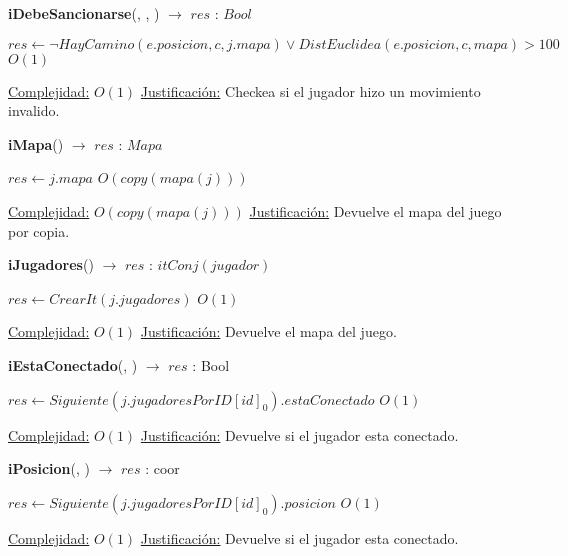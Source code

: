 \begin{algorithm}[H]{\textbf{iDebeSancionarse}(, , ) $\to$ $res$ : $Bool$} 
	\begin{algorithmic}
		\State $res \gets \neg HayCamino(e.posicion, c, j.mapa) \lor DistEuclidea(e.posicion, c, mapa) > 100 $ \Comment $O(1)$
	
		\medskip
		\Statex \underline{Complejidad:} $O(1)$
		\Statex \underline{Justificación:} Checkea si el jugador hizo un movimiento invalido.
    \end{algorithmic}
\end{algorithm}

\begin{algorithm}[H]{\textbf{iMapa}() $\to$ $res$ : $Mapa$} 
	{}
	\begin{algorithmic}
		\State $res \gets j.mapa $ \Comment $O(copy(mapa(j)))$
	
		\medskip
		\Statex \underline{Complejidad:} $O(copy(mapa(j)))$
		\Statex \underline{Justificación:} Devuelve el mapa del juego por copia.
    \end{algorithmic}
\end{algorithm}

\begin{algorithm}[H]{\textbf{iJugadores}() $\to$ $res$ : $itConj(jugador)$} 
	{}
	\begin{algorithmic}
		\State $res \gets CrearIt(j.jugadores) $ \Comment $O(1)$
	
		\medskip
		\Statex \underline{Complejidad:} $O(1)$
		\Statex \underline{Justificación:} Devuelve el mapa del juego.
    \end{algorithmic}
\end{algorithm}

\begin{algorithm}[H]{\textbf{iEstaConectado}(, ) $\to$ $res$ : Bool} 
	{}
	\begin{algorithmic}
		\State $res \gets Siguiente(j.jugadoresPorID[id]_0).estaConectado $ \Comment $O(1)$
	
		\medskip
		\Statex \underline{Complejidad:} $O(1)$
		\Statex \underline{Justificación:} Devuelve si el jugador esta conectado.
    \end{algorithmic}
\end{algorithm}

\begin{algorithm}[H]{\textbf{iPosicion}(, ) $\to$ $res$ : coor} 
	{}
	\begin{algorithmic}
		\State $res \gets Siguiente(j.jugadoresPorID[id]_0).posicion $ \Comment $O(1)$
	
		\medskip
		\Statex \underline{Complejidad:} $O(1)$
		\Statex \underline{Justificación:} Devuelve si el jugador esta conectado.
    \end{algorithmic}
\end{algorithm}

